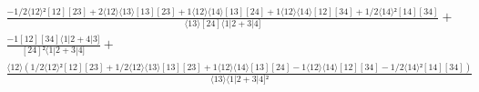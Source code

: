 \documentclass[varwidth, border=5pt]{standalone}
\begin{document}
\begin{my}
$\begin{gathered}
\scriptscriptstyle\frac{-1/2⟨12⟩²[12][23]+2⟨12⟩⟨13⟩[13][23]+1⟨12⟩⟨14⟩[13][24]+1⟨12⟩⟨14⟩[12][34]+1/2⟨14⟩²[14][34]}{⟨13⟩[24]⟨1|2+3|4]} +\\
\scriptscriptstyle\frac{-1[12][34]⟨1|2+4|3]}{[24]²⟨1|2+3|4]} +\\
\scriptscriptstyle\frac{⟨12⟩(1/2⟨12⟩²[12][23]+1/2⟨12⟩⟨13⟩[13][23]+1⟨12⟩⟨14⟩[13][24]-1⟨12⟩⟨14⟩[12][34]-1/2⟨14⟩²[14][34])}{⟨13⟩⟨1|2+3|4]²} \phantom{+}
\end{gathered}$
\end{my}
\end{document}
